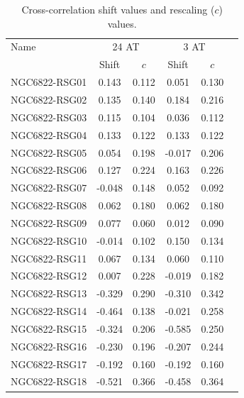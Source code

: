\begin{table}
\scriptsize
 \caption[$c$-values]{
    Cross-correlation shift values and rescaling ($c$) values.
    }
 \label{c value}
 \begin{center}
  \begin{tabular}{lccccc}
   \hline
 Name  & \multicolumn{2}{c}{24 AT}  & \multicolumn{2}{c}{3 AT} \\
 &  Shift &  $c$  & Shift &  $c$\\
   \hline
   NGC6822-RSG01 &  0.143 & 0.112  &  0.051 & 0.130  \\ %
   NGC6822-RSG02 &  0.135 & 0.140  &  0.184 & 0.216  \\ %
   NGC6822-RSG03 &  0.115 & 0.104  &  0.036 & 0.112  \\ %
   NGC6822-RSG04 &  0.133 & 0.122  &  0.133 & 0.122  \\ %
   NGC6822-RSG05 &  0.054 & 0.198  & -0.017 & 0.206  \\ %
   NGC6822-RSG06 &  0.127 & 0.224  &  0.163 & 0.226  \\ %
   NGC6822-RSG07 & -0.048 & 0.148  &  0.052 & 0.092  \\ %
   NGC6822-RSG08 &  0.062 & 0.180  &  0.062 & 0.180  \\ %
   NGC6822-RSG09 &  0.077 & 0.060  &  0.012 & 0.090  \\ %
   NGC6822-RSG10 & -0.014 & 0.102  &  0.150 & 0.134  \\ %
   NGC6822-RSG11 &  0.067 & 0.134  &  0.060 & 0.110  \\ %
   NGC6822-RSG12 &  0.007 & 0.228  & -0.019 & 0.182  \\ %
   NGC6822-RSG13 & -0.329 & 0.290  & -0.310 & 0.342  \\ %
   NGC6822-RSG14 & -0.464 & 0.138  & -0.021 & 0.258  \\ %
   NGC6822-RSG15 & -0.324 & 0.206  & -0.585 & 0.250  \\ %
   NGC6822-RSG16 & -0.230 & 0.196  & -0.207 & 0.244  \\ %
   NGC6822-RSG17 & -0.192 & 0.160  & -0.192 & 0.160  \\ %
   NGC6822-RSG18 & -0.521 & 0.366  & -0.458 & 0.364  \\ %
   \hline
  \end{tabular}
 \end{center}
\end{table}


